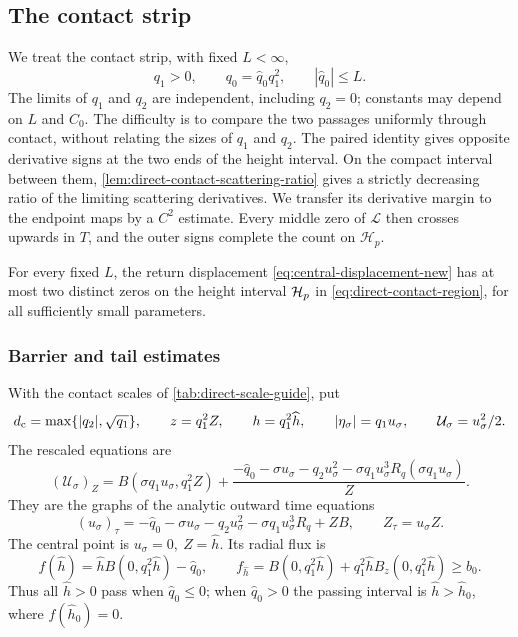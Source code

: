 \subsection{The contact strip}
\label{sec:direct-bounded-contact}

We treat the contact strip, with fixed \(L<\infty\),
\begin{equation}
\label{eq:direct-contact-region}
 q_1>0,\qquad q_0=\widehat q_0 q_1^2,\qquad |\widehat q_0|\le L .
\end{equation}
The limits of \(q_1\) and \(q_2\) are independent, including
\(q_2=0\); constants may depend on \(L\) and \(C_0\).
The difficulty is to compare the two passages uniformly through
contact, without relating the sizes of \(q_1\) and \(q_2\).
The paired identity gives opposite derivative signs at the two ends
of the height interval. On the compact interval between them,
\cref{lem:direct-contact-scattering-ratio} gives a strictly decreasing
ratio of the limiting scattering derivatives. We transfer its derivative
margin to the endpoint maps by a \(C^2\) estimate. Every middle zero
of \(\mathcal L\) then crosses upwards in \(T\), and the outer signs
complete the count on \(\mathcal H_p\).

\begin{proposition}
\label{prop:direct-bounded-contact}
For every fixed \(L\), the return displacement
\eqref{eq:central-displacement-new} has at most two
distinct zeros on the height interval \(\mathcal H_p\) in
\eqref{eq:direct-contact-region}, for all sufficiently small parameters.
\end{proposition}

\subsubsection{Barrier and tail estimates}

With the contact scales of \cref{tab:direct-scale-guide}, put
\[
 d_{\rm c}=\max\{|q_2|,\sqrt{q_1}\},\qquad
 z=q_1^2 Z,\qquad h=q_1^2 \widehat h,\qquad
 |\eta_\sigma|=q_1u_\sigma,\qquad
 \mathcal U_\sigma=u_\sigma^2/2 .
\]
The rescaled equations are
\begin{equation}
\label{eq:direct-contact-equations}
 (\mathcal U_\sigma)_Z
 =B(\sigma q_1u_\sigma,q_1^2Z)
  +\frac{-\widehat q_0-\sigma u_\sigma-q_2u_\sigma^2
               -\sigma q_1u_\sigma^3R_q(\sigma q_1u_\sigma)}{Z}.
\end{equation}
They are the graphs of the analytic outward time equations
\begin{equation}
\label{eq:direct-contact-time}
 (u_\sigma)_\tau=-\widehat q_0-\sigma u_\sigma-q_2u_\sigma^2
               -\sigma q_1u_\sigma^3R_q+ZB,\qquad
 Z_\tau=u_\sigma Z .
\end{equation}
The central point is \(u_\sigma=0,\ Z=\widehat h\). Its radial flux is
\[
 f(\widehat h)=\widehat h B(0,q_1^2\widehat h)-\widehat q_0,\qquad
 f_{\widehat h}=B(0,q_1^2\widehat h)
   +q_1^2\widehat h B_z(0,q_1^2\widehat h)\ge b_0.
\]
Thus all \(\widehat h>0\) pass when \(\widehat q_0\le0\); when \(\widehat q_0>0\)
the passing interval is \(\widehat h>\widehat h_0\), where \(f(\widehat h_0)=0\).

